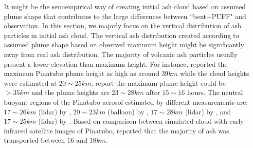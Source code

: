 It might be the semiempirical way of creating initial ash cloud based on assumed plume shape that contributes to the large differences between ``bent+PUFF" and observation. In this section, we majorly focus on the vertical distribution of ash particles in initial ash cloud. The vertical ash distribution created according to assumed plume shape based on observed maximum height might be significantly away from real ash distribution.
The majority of volcanic ash particles usually present a lower elevation than maximum height. For instance, \citet{holasek1996satellite, holasek1996experiments} reported the maximum Pinatubo plume height as high as around $39 km$ while the cloud heights were estimated at $20 \sim 25 km $, \citet{self1993atmospheric} report the maximum plume height could be $>35 km$ and the plume heights are $23 \sim 28 km$ after $15 \sim 16$ hours. The neutral buoyant regions of the Pinatubo aerosol estimated by different measurements are: $17 \sim 26 km$ (lidar) by \citet{defoor1992early}, $20 \sim 23 km$ (balloon) by \citet{deshler1992balloonborne}, $17 \sim 28 km$ (lidar) by \citet{jager1992pinatubo}, and $17 \sim 25 km$ (lidar) by \citet{avdyushin19931}. Based on comparison between simulated cloud with early infrared satellite images of Pinatubo, \citet{fero2008simulation} reported that the majority of ash was transported between $16$ and $18 km$. 

